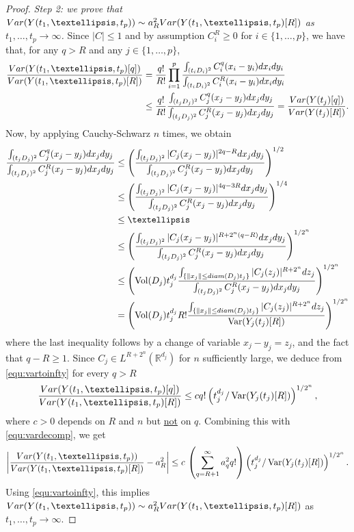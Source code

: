 \documentclass[12pt]{article}
\DeclareMathOperator{\var}{Var}
\DeclareMathOperator{\1}{1}
\DeclareMathOperator{\vol}{Vol}
\newcommand{\R}{\mathbb{R}}
\theoremstyle{plain}
\theoremstyle{definition}
\begin{document}
\begin{proof}
\textit{Step 2: we prove that ${\rm Var}(Y(t_1,\dots,t_p))\sim a^2_R {\rm Var}(Y(t_1,\dots,t_p)[R])$ as $t_1,\ldots,t_p\to\infty$.}
Since $|C|\le1$ and by assumption $C_i^R\ge0$ for $i\in\{1,\dots,p\}$, we have that, for any $q>R$ and 
any $j\in \{1,\ldots,p\}$,
\begin{align} \label{equ:varsplitting}
    \frac{{\rm Var}(Y(t_1,\dots,t_p)[q])}{{\rm Var}(Y(t_1,\dots,t_p)[R])}&=\frac{q!}{R!}\prod_{i=1}^p\frac{\int_{(t_iD_i)^2}C_i^q(x_i-y_i)dx_idy_i}{\int_{(t_iD_i)^2}C_i^R(x_i-y_i)dx_idy_i}\\ 
    &\le \frac{q!}{R!} \frac{\int_{(t_jD_j)^2}C_j^q(x_j-y_j)dx_jdy_j}{\int_{(t_jD_j)^2}C_j^R(x_j-y_j)dx_jdy_j}=\frac{{\rm Var}(Y(t_j)[q])}{{\rm Var}(Y(t_j)[R])}.
\end{align}
Now, by applying Cauchy-Schwarz $n$ times, we obtain 
\begin{align*}
    \frac{\int_{(t_jD_j)^2}C_j^q(x_j-y_j)dx_jdy_j} {\int_{(t_jD_j)^2}C_j^R(x_j-y_j)dx_jdy_j} & \le\left(\frac{\int_{(t_jD_j)^2}|C_j(x_j-y_j)|^{2q-R}dx_jdy_j}{\int_{(t_jD_j)^2}C_j^R(x_j-y_j)dx_jdy_j}\right)^{1/2}\\
    &\le\left(\frac{\int_{(t_jD_j)^2}|C_j(x_j-y_j)|^{4q-3R}dx_jdy_j}{\int_{(t_jD_j)^2}C_j^R(x_j-y_j)dx_jdy_j}\right)^{1/4}\\
    &\le \dots \\
    &\le \left(\frac{\int_{(t_jD_j)^2}|C_j(x_j-y_j)|^{R+2^n(q-R)}dx_jdy_j}{\int_{(t_jD_j)^2}C_j^R(x_j-y_j)dx_jdy_j}\right)^{1/2^n}\\
    &\le \left(\vol(D_j)t_j^{d_j}\frac{\int_{\{\|x_j\|\le {\rm diam}(D_j)t_j\}}|C_j(z_j)|^{R+2^n}dz_j}{\int_{(t_jD_j)^2}C_j^R(x_j-y_j)dx_jdy_j}\right)^{1/2^n}\\
    &=  \left(\vol(D_j)t_j^{d_j}R!\frac{\int_{\{\|x_j\|\le {\rm diam}(D_j)t_j\}}|C_j(z_j)|^{R+2^n}dz_j}{\var(Y_j(t_j)[R])}\right)^{1/2^n}
\end{align*}
where the last inequality follows by a change of variable $x_j-y_j=z_j$, and the fact that $q-R\ge1$.
Since $C_j\in L^{R+2^n}(\R^{d_j})$ for $n$ sufficiently large, we deduce from \eqref{equ:vartoinfty} for every $q>R$
\[
\frac{{\rm Var}(Y(t_1,\dots,t_p)[q])}{{\rm Var}(Y(t_1,\dots,t_p)[R])}\le cq! \left(t_j^{d_j}/\var(Y_j(t_j)[R])\right)^{1/2^n},
\]
where $c>0$ depends on $R$ and $n$ but \underline{not} on $q$.
Combining this with 
\eqref{equ:vardecomp}, we get
\begin{equation}\label{kivabien}
 \left|\frac{{\rm Var}(Y(t_1,\dots,t_p))}{{\rm Var}(Y(t_1,\dots,t_p)[R])}-a^2_R\right|\leq c\,\left(\sum_{q=R+1}^\infty a_q^2q!\right)\left(t_j^{d_j}/\var(Y_j(t_j)[R])\right)^{1/2^n}.
\end{equation}
Using \eqref{equ:vartoinfty}, this implies ${\rm Var}(Y(t_1,\dots,t_p))\sim a^2_R {\rm Var}(Y(t_1,\dots,t_p)[R])$ as $t_1,\ldots,t_p\to\infty$.


\end{proof}
\end{document}

